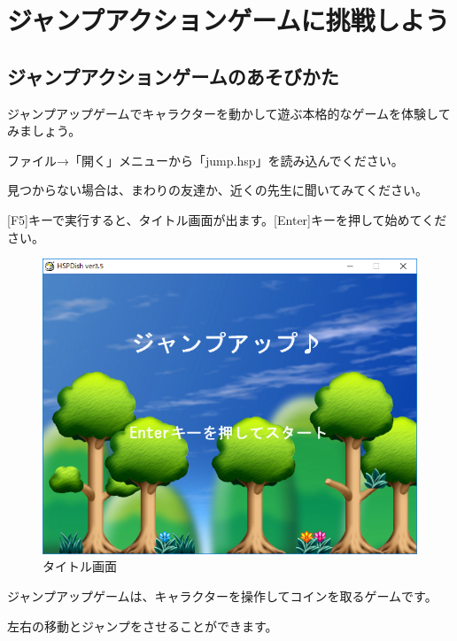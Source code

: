 \newpage

\section{ジャンプアクションゲームに挑戦しよう}


\subsection{ジャンプアクションゲームのあそびかた}



ジャンプアップゲームでキャラクターを動かして遊ぶ本格的なゲームを体験してみましょう。


ファイル→「開く」メニューから「jump.hsp」を読み込んでください。

見つからない場合は、まわりの友達か、近くの先生に聞いてみてください。

[F5]キーで実行すると、タイトル画面が出ます。[Enter]キーを押して始めてください。


\begin{figure}[H]
    \begin{center}
      \includegraphics[keepaspectratio,width=11.192cm,height=8.827cm]{text04-img/text04-img022.png}
      \caption{タイトル画面}
    \end{center}
    \label{fig:prog_menu}
\end{figure}

ジャンプアップゲームは、キャラクターを操作してコインを取るゲームです。

左右の移動とジャンプをさせることができます。



